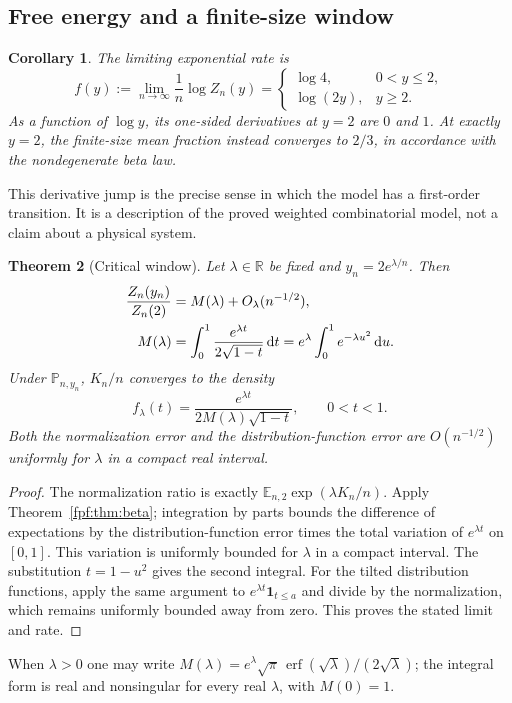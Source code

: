 \documentclass[11pt]{article}
\numberwithin{equation}{section}
\newtheorem{theorem}{Theorem}[section]
\newtheorem{corollary}[theorem]{Corollary}
\theoremstyle{definition}
\newcommand{\E}{\mathbb E}
\newcommand{\Prob}{\mathbb P}
\newcommand{\dd}{\mathrm d}
\newcommand{\ind}{\mathbf 1}
\begin{document}
\subsection{Free energy and a finite-size window}
\begin{corollary}\label{fpf:cor:freeenergy}
The limiting exponential rate is
\begin{equation}\label{fpf:eq:freeenergy}
 f(y):=\lim_{n\to\infty}\frac1n\log Z_n(y)
 =\begin{cases}
 \log4,&0<y\le2,\\
 \log(2y),&y\ge2.
 \end{cases}
\end{equation}
As a function of $\log y$, its one-sided derivatives at $y=2$ are $0$ and
$1$. At exactly $y=2$, the finite-size mean fraction instead converges to
$2/3$, in accordance with the nondegenerate beta law.
\end{corollary}
This derivative jump is the precise sense in which the model has a
first-order transition. It is a description of the proved weighted
combinatorial model, not a claim about a physical system.

\begin{theorem}[Critical window]\label{fpf:thm:window}
Let $\lambda\in\mathbb R$ be fixed and $y_n=2e^{\lambda/n}$. Then
\begin{align}\label{fpf:eq:window-normalization}
 \frac{Z_n(y_n)}{Z_n(2)}&=M(\lambda)+O_\lambda(n^{-1/2}),\notag\\
 M(\lambda)&=\int_0^1\frac{e^{\lambda t}}{2\sqrt{1-t}}\,\dd t
             =e^\lambda\int_0^1e^{-\lambda u^2}\,\dd u.
\end{align}
Under $\Prob_{n,y_n}$, $K_n/n$ converges to the density
\begin{equation}\label{fpf:eq:window-density}
 f_\lambda(t)=\frac{e^{\lambda t}}
                     {2M(\lambda)\sqrt{1-t}},\qquad 0<t<1.
\end{equation}
Both the normalization error and the distribution-function error are
$O(n^{-1/2})$ uniformly for $\lambda$ in a compact real interval.
\end{theorem}
\begin{proof}
The normalization ratio is exactly
$\E_{n,2}\exp(\lambda K_n/n)$. Apply
Theorem~\ref{fpf:thm:beta}; integration by parts bounds the difference of
expectations by the distribution-function error times the total variation
of $e^{\lambda t}$ on $[0,1]$. This variation is uniformly bounded for
$\lambda$ in a compact interval. The substitution $t=1-u^2$ gives the
second integral. For the tilted distribution functions, apply the same
argument to $e^{\lambda t}\ind_{t\le a}$ and divide by the normalization,
which remains uniformly bounded away from zero. This proves the stated
limit and rate.
\end{proof}
When $\lambda>0$ one may write
$M(\lambda)=e^\lambda\sqrt\pi\,\operatorname{erf}(\sqrt\lambda)/(2\sqrt\lambda)$;
the integral form is real and nonsingular for every real $\lambda$, with
$M(0)=1$.
\end{document}
